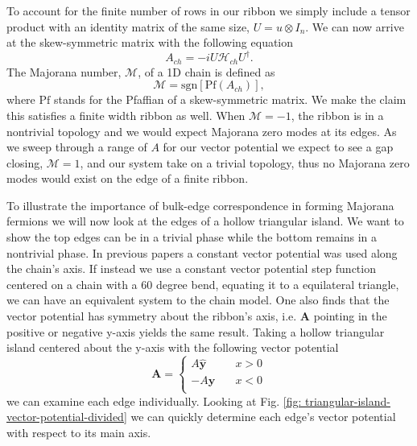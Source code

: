 \documentclass[aps,prb,showpacs,amsmath,amssymb,superscriptaddress]{revtex4-2}
\let\oldhat\hat
\renewcommand{\hat}[1]{\oldhat{\mathbf{#1}}}
\renewcommand{\vec}[1]{\mathbf{#1}}
\newcommand{\ham}{\mathcal{H}}
\begin{document}
To account for the finite number of rows in our ribbon we simply include a tensor product with an identity matrix of the same size, $U = u \otimes I_n$.
We can now arrive at the skew-symmetric matrix with the following equation
\begin{equation}
  A_{ch} = -i U \ham_{ch} U^{\dagger}.
\end{equation}
The Majorana number, $\mathcal{M}$, of a 1D chain is defined as
\begin{equation}
  \mathcal{M} = \text{sgn}[\text{Pf}(A_{ch})],
\end{equation}
where $\text{Pf}$ stands for the Pfaffian of a skew-symmetric matrix.
We make the claim this satisfies a finite width ribbon as well.
When $\mathcal{M} = -1$, the ribbon is in a nontrivial topology and we would expect Majorana zero modes at its edges.
As we sweep through a range of $A$ for our vector potential we expect to see a gap closing, $\mathcal{M} = 1$, and our system take on a trivial topology, thus no Majorana zero modes would exist on the edge of a finite ribbon.

To illustrate the importance of bulk-edge correspondence in forming Majorana fermions we will now look at the edges of a hollow triangular island.
We want to show the top edges can be in a trivial phase while the bottom remains in a nontrivial phase.
In previous papers a constant vector potential was used along the chain's axis.
If instead we use a constant vector potential step function centered on a chain with a 60 degree bend, equating it to a equilateral triangle, we can have an equivalent system to the chain model.
One also finds that the vector potential has symmetry about the ribbon's axis, i.e. $\vec{A}$ pointing in the positive or negative y-axis yields the same result.
Taking a hollow triangular island centered about the y-axis with the following vector potential
\begin{equation}
  \vec{A} = \begin{cases}
            A \hat{y} \quad &x > 0 \\
            -A \hat{y} \quad &x < 0 \\
            \end{cases}
\end{equation}
we can examine each edge individually.
Looking at Fig. \ref{fig: triangular-island-vector-potential-divided} we can quickly determine each edge's vector potential with respect to its main axis.
\end{document}
